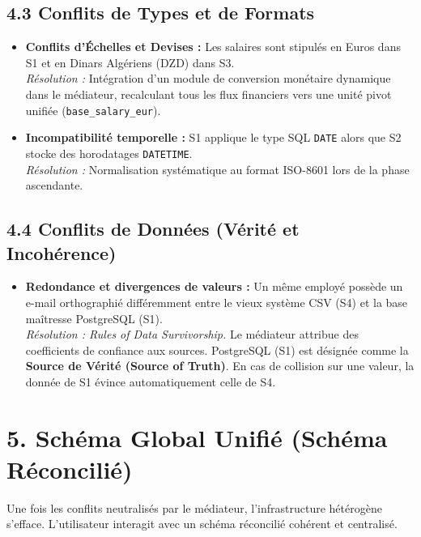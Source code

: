 \documentclass[11pt,a4paper]{article}
\begin{document}
\subsection{4.3 Conflits de Types et de Formats}
\begin{itemize}
    \item \textbf{Conflits d'Échelles et Devises :} Les salaires sont stipulés en Euros dans S1 et en Dinars Algériens (DZD) dans S3.
    \\ \textit{Résolution :} Intégration d'un module de conversion monétaire dynamique dans le médiateur, recalculant tous les flux financiers vers une unité pivot unifiée (\texttt{base\_salary\_eur}).
    \item \textbf{Incompatibilité temporelle :} S1 applique le type SQL \texttt{DATE} alors que S2 stocke des horodatages \texttt{DATETIME}.
    \\ \textit{Résolution :} Normalisation systématique au format ISO-8601 lors de la phase ascendante.
\end{itemize}

\subsection{4.4 Conflits de Données (Vérité et Incohérence)}
\begin{itemize}
    \item \textbf{Redondance et divergences de valeurs :} Un même employé possède un e-mail orthographié différemment entre le vieux système CSV (S4) et la base maîtresse PostgreSQL (S1).
    \\ \textit{Résolution : Rules of Data Survivorship.} Le médiateur attribue des coefficients de confiance aux sources. PostgreSQL (S1) est désignée comme la \textbf{Source de Vérité (Source of Truth)}. En cas de collision sur une valeur, la donnée de S1 évince automatiquement celle de S4.
\end{itemize}

\newpage

\section{5. Schéma Global Unifié (Schéma Réconcilié)}
Une fois les conflits neutralisés par le médiateur, l'infrastructure hétérogène s'efface. L'utilisateur interagit avec un schéma réconcilié cohérent et centralisé.
\end{document}
